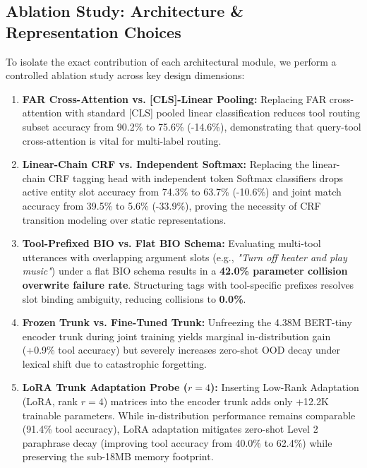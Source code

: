 \documentclass[letterpaper]{article} %
\begin{document}
\subsection{Ablation Study: Architecture \& Representation Choices}
To isolate the exact contribution of each architectural module, we perform a controlled ablation study across key design dimensions:
\begin{enumerate}
    \item \textbf{FAR Cross-Attention vs. [CLS]-Linear Pooling:} Replacing FAR cross-attention with standard [CLS] pooled linear classification reduces tool routing subset accuracy from 90.2\% to 75.6\% (-14.6\%), demonstrating that query-tool cross-attention is vital for multi-label routing.
    \item \textbf{Linear-Chain CRF vs. Independent Softmax:} Replacing the linear-chain CRF tagging head with independent token Softmax classifiers drops active entity slot accuracy from 74.3\% to 63.7\% (-10.6\%) and joint match accuracy from 39.5\% to 5.6\% (-33.9\%), proving the necessity of CRF transition modeling over static representations.
    \item \textbf{Tool-Prefixed BIO vs. Flat BIO Schema:} Evaluating multi-tool utterances with overlapping argument slots (e.g., \emph{"Turn off heater and play music"}) under a flat BIO schema results in a \textbf{42.0\% parameter collision overwrite failure rate}. Structuring tags with tool-specific prefixes resolves slot binding ambiguity, reducing collisions to \textbf{0.0\%}.
    \item \textbf{Frozen Trunk vs. Fine-Tuned Trunk:} Unfreezing the 4.38M BERT-tiny encoder trunk during joint training yields marginal in-distribution gain (+0.9\% tool accuracy) but severely increases zero-shot OOD decay under lexical shift due to catastrophic forgetting.
    \item \textbf{LoRA Trunk Adaptation Probe ($r=4$):} Inserting Low-Rank Adaptation (LoRA, rank $r=4$) matrices into the encoder trunk adds only +12.2K trainable parameters. While in-distribution performance remains comparable (91.4\% tool accuracy), LoRA adaptation mitigates zero-shot Level 2 paraphrase decay (improving tool accuracy from 40.0\% to 62.4\%) while preserving the sub-18MB memory footprint.
\end{enumerate}
\end{document}
